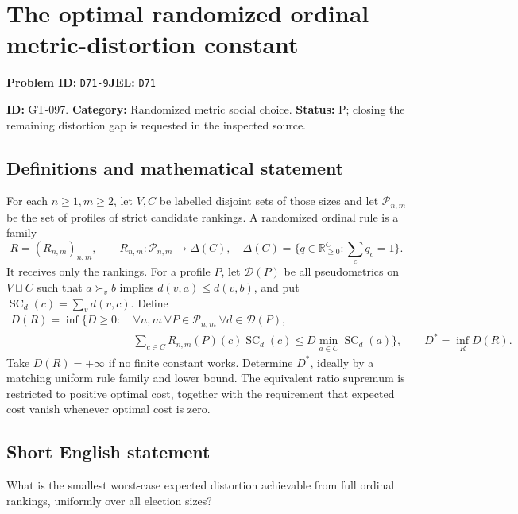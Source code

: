 \documentclass[11pt,a4paper]{article}
\begin{document}
\section*{The optimal randomized ordinal metric-distortion constant}
\textbf{Problem ID:} \texttt{D71-9}\quad \textbf{JEL:} \texttt{D71}\par
\label{problem:OP-0227}
\label{game:GT-097}
{\sffamily\small\color{muted}
\noindent\textbf{ID:} GT-097. \textbf{Category:} Randomized metric social choice.
\textbf{Status:} P; closing the remaining distortion gap is requested in the inspected source.
\par}
\subsection*{Definitions and mathematical statement}
For each $n\geq1,m\geq2$, let $V,C$ be labelled disjoint sets of those sizes and let $\mathcal P_{n,m}$ be the set of profiles of strict candidate rankings. A randomized ordinal rule is a family
\[
 R=(R_{n,m})_{n,m},\qquad R_{n,m}:\mathcal P_{n,m}\to\Delta(C),
 \quad\Delta(C)=\{q\in\mathbb R_{\geq0}^{C}:\sum_cq_c=1\}.
\]
It receives only the rankings. For a profile $P$, let $\mathcal D(P)$ be all pseudometrics on $V\sqcup C$ such that $a\succ_v b$ implies $d(v,a)\leq d(v,b)$, and put
$\operatorname{SC}_d(c)=\sum_vd(v,c)$.
Define
\[
 \begin{split}
 D(R)=\inf\{D\geq0:\ &\forall n,m\ \forall P\in\mathcal P_{n,m}\
                         \forall d\in\mathcal D(P),\\
 &\sum_{c\in C}R_{n,m}(P)(c)\operatorname{SC}_d(c)
      \leq D\min_{a\in C}\operatorname{SC}_d(a)\},
 \qquad D^*=\inf_R D(R).
 \end{split}
\]
Take $D(R)=+\infty$ if no finite constant works. Determine $D^*$, ideally by a matching uniform rule family and lower bound. The equivalent ratio supremum is restricted to positive optimal cost, together with the requirement that expected cost vanish whenever optimal cost is zero.

\subsection*{Short English statement}
What is the smallest worst-case expected distortion achievable from full ordinal rankings, uniformly over all election sizes?
\end{document}
